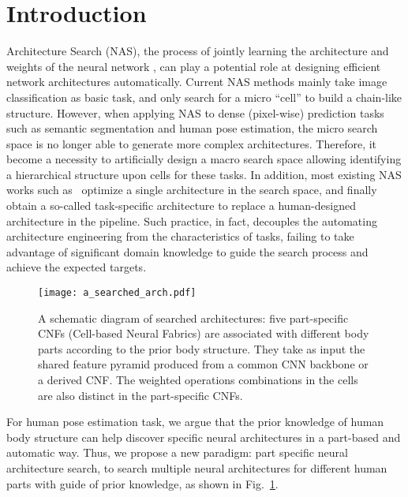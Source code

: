\documentclass[journal]{IEEEtran}
\begin{document}
\IEEEpeerreviewmaketitle



\section{Introduction}

 Architecture Search (NAS), the process of jointly learning the architecture and weights of the neural network \cite{liu2018darts,Zoph2016NeuralAS, Ghiasi_2019_CVPR,chen2018searching,zoph2018learning,elsken2018neural,real2018regularized,Xie_2019_ICCV,liu2019auto}, can play a potential role at designing efficient network architectures automatically. Current NAS methods mainly take image classification as basic task, and only search for a micro “cell” to build a chain-like structure. However, when applying NAS to dense (pixel-wise) prediction tasks such as semantic segmentation and human pose estimation, the micro search space is no longer able to generate more complex architectures. Therefore, it become a necessity to artificially design a macro search space allowing identifying a hierarchical structure upon cells for these tasks. In addition, most existing NAS works such as~\cite{liu2018darts,Ghiasi_2019_CVPR,liu2019auto,xie2018snas, hu2020dsnas} optimize a single architecture in the search space, and finally obtain a so-called task-specific architecture to replace a human-designed architecture in the pipeline. Such practice, in fact, decouples the automating architecture engineering from the characteristics of tasks, failing to take advantage of significant domain knowledge to guide the search process and achieve the expected targets.
\begin{figure}
	\begin{center}
\texttt{[image: a\_searched\_arch.pdf]} \end{center}
	\caption{ A schematic diagram of searched architectures: five part-specific CNFs (Cell-based Neural Fabrics) are associated with different body parts according to the prior body structure. They take as input the shared feature pyramid produced from a common CNN backbone or a derived CNF. The weighted operations combinations in the cells are also distinct in the part-specific CNFs.}
	\label{f_show}
\end{figure}

For human pose estimation task, we argue that the prior knowledge of human body structure can help discover specific neural architectures in a part-based and automatic way. Thus, we propose a new paradigm: part specific neural architecture search, to search multiple neural architectures for different human parts with guide of prior knowledge, as shown in Fig.~\ref{f_show}.
\end{document}
